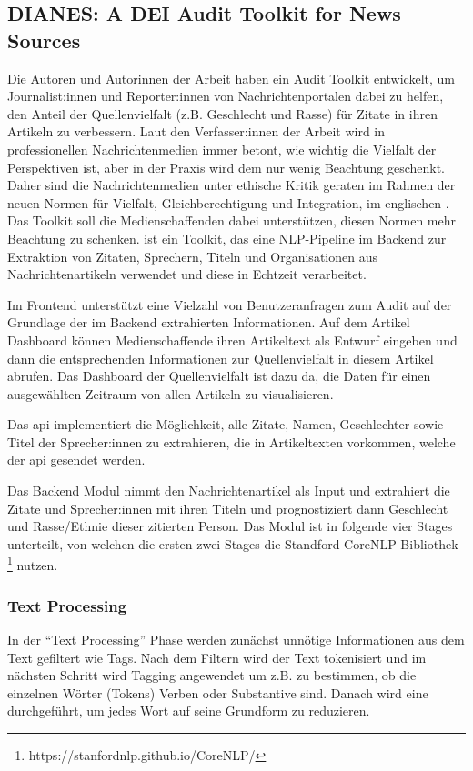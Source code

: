 \subsection{DIANES: A DEI Audit Toolkit for News Sources}
Die Autoren und Autorinnen der Arbeit  \cite{10.1145/3477495.3531660} haben ein Audit Toolkit entwickelt,
um Journalist:innen und Reporter:innen von Nachrichtenportalen dabei zu helfen, 
den Anteil der Quellenvielfalt (z.B. Geschlecht und Rasse) für Zitate in ihren Artikeln zu verbessern.
Laut den Verfasser:innen der Arbeit wird in professionellen Nachrichtenmedien immer betont, wie wichtig die Vielfalt der Perspektiven ist, 
aber in der Praxis wird dem nur wenig Beachtung geschenkt.
Daher sind die Nachrichtenmedien unter ethische Kritik geraten im Rahmen der neuen Normen für Vielfalt, Gleichberechtigung und Integration, 
im englischen .
Das Toolkit soll die Medienschaffenden dabei unterstützen, diesen Normen mehr Beachtung zu schenken.
 ist ein  Toolkit, das eine NLP-Pipeline im Backend zur Extraktion von Zitaten, Sprechern, Titeln und Organisationen
aus Nachrichtenartikeln verwendet und diese in Echtzeit verarbeitet. 

Im Frontend unterstützt  eine Vielzahl von Benutzeranfragen zum  Audit auf der Grundlage der im Backend extrahierten Informationen. 
Auf dem Artikel Dashboard können Medienschaffende ihren Artikeltext als Entwurf eingeben und 
dann die entsprechenden Informationen zur Quellenvielfalt in diesem Artikel abrufen.
Das Dashboard der Quellenvielfalt ist dazu da, die  Daten für einen ausgewählten Zeitraum von allen Artikeln zu visualisieren.

Das \gls{api} implementiert die Möglichkeit, alle Zitate, Namen, Geschlechter sowie Titel der Sprecher:innen zu extrahieren, 
die in Artikeltexten vorkommen, welche der \gls{api} gesendet werden.

Das Backend Modul nimmt den Nachrichtenartikel als Input und extrahiert die Zitate und Sprecher:innen mit ihren Titeln und
prognostiziert dann Geschlecht und Rasse/Ethnie dieser zitierten Person.
Das Modul ist in folgende vier Stages unterteilt, von welchen die ersten zwei Stages  
die Standford CoreNLP Bibliothek \footnote{https://stanfordnlp.github.io/CoreNLP/} nutzen.

\subsubsection{Text Processing}
In der \enquote{Text Processing} Phase werden zunächst unnötige Informationen aus dem Text gefiltert wie  Tags.
Nach dem Filtern wird der Text tokenisiert und im nächsten Schritt wird  Tagging angewendet um z.B. zu bestimmen,
ob die einzelnen Wörter (Tokens) Verben oder Substantive sind. 
Danach wird eine  durchgeführt, um jedes Wort auf seine Grundform zu reduzieren.

